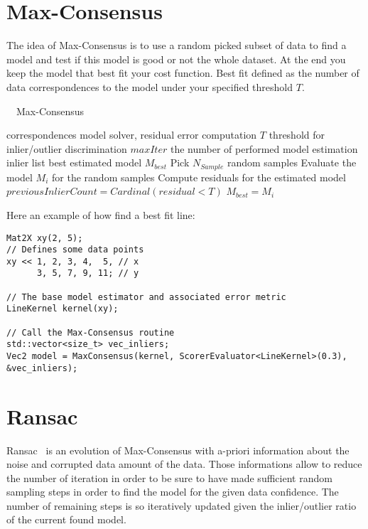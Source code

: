\documentclass[11pt, letterpaper]{report}
\begin{document}
\newpage
\section{Max-Consensus}
The idea of Max-Consensus is to use a random picked subset of data to find a model and test if this model is good or not the whole dataset. At the end you keep the model that best fit your cost function. Best fit defined as the number of data correspondences to the model under your specified threshold $T$.

\begin{algorithm}
\caption{~~Max-Consensus}
\begin{algorithmic}\label{algo:Max-Consensus}
\REQUIRE correspondences
\REQUIRE model solver, residual error computation
\REQUIRE $T$ threshold for inlier/outlier discrimination
\REQUIRE $maxIter$ the number of performed model estimation
\ENSURE inlier list
\ENSURE best estimated model $M_{best}$
\STATE Pick $N_{Sample}$ random samples
\STATE Evaluate the model $M_i$ for the random samples
\STATE Compute residuals for the estimated model
\STATE $previousInlierCount = Cardinal(residual<T)$
\STATE $M_{best} = M_i$
\ENDIF
\ENDFOR
\end{algorithmic}
\end{algorithm}

Here an example of how find a best fit line:
\vspace{-.5cm}
\begin{lstlisting}
Mat2X xy(2, 5);
// Defines some data points
xy << 1, 2, 3, 4,  5, // x 
      3, 5, 7, 9, 11; // y

// The base model estimator and associated error metric
LineKernel kernel(xy);

// Call the Max-Consensus routine
std::vector<size_t> vec_inliers;
Vec2 model = MaxConsensus(kernel, ScorerEvaluator<LineKernel>(0.3), &vec_inliers);
\end{lstlisting}

\newpage
\section{Ransac}
Ransac~\cite{DBLP:journals/cacm/FischlerB81} is an evolution of Max-Consensus with a-priori information about the noise and corrupted data amount of the data. Those informations allow to reduce the number of iteration in order to be sure to have made sufficient random sampling steps in order to find the model for the given data confidence. The number of remaining steps is so iteratively updated given the inlier/outlier ratio of the current found model.
\end{document}
